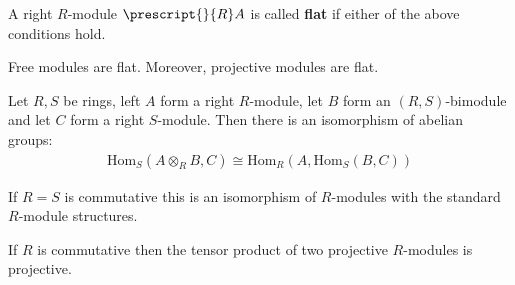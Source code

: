 \documentclass{memoir}
\begin{document}
\begin{defn}
	A right \(R\)-module \(\prescript{}{R}A\) is called \textbf{flat} if either of the above conditions hold.
\end{defn}

\begin{cor}
	Free modules are flat. Moreover, projective modules are flat.
\end{cor}

\begin{exmp}
	
\end{exmp}

\begin{thm}
	Let \(R,S\) be rings, left \(A\) form a right \(R\)-module, let \(B\) form an \((R,S)\)-bimodule and let \(C\) form a right \(S\)-module. Then there is an isomorphism of abelian groups:
	\begin{align*}
		\textrm{Hom}_S(A \otimes_R B, C) \cong \textrm{Hom}_R(A, \textrm{Hom}_S(B,C))
	\end{align*}
\end{thm}
If \(R=S\) is commutative this is an isomorphism of \(R\)-modules with the standard \(R\)-module structures.

\begin{cor}
	If \(R\) is commutative then the tensor product of two projective \(R\)-modules is projective.
\end{cor}
\end{document}

